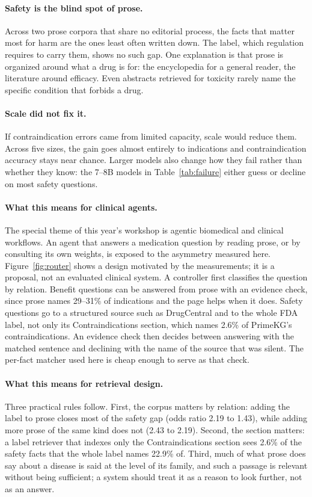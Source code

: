\documentclass[letterpaper]{article} %
\begin{document}
\paragraph{Safety is the blind spot of prose.}
Across two prose corpora that share no editorial process, the facts that
matter most for harm are the ones least often written down. The label, which
regulation requires to carry them, shows no such gap. One explanation is that
prose is organized around what a drug is for: the encyclopedia for a general
reader, the literature around efficacy. Even abstracts retrieved for toxicity
rarely name the specific condition that forbids a drug.

\paragraph{Scale did not fix it.}
If contraindication errors came from limited capacity, scale would reduce
them. Across five sizes, the gain goes almost entirely to indications and
contraindication accuracy stays near chance. Larger models also change how
they fail rather than whether they know: the 7--8B models in
Table~\ref{tab:failure} either guess or decline on most safety questions.

\paragraph{What this means for clinical agents.}
The special theme of this year's workshop is agentic biomedical and clinical
workflows. An agent that answers a medication question by reading prose, or by
consulting its own weights, is exposed to the asymmetry measured here.
Figure~\ref{fig:router} shows a design motivated by the measurements; it is a
proposal, not an evaluated clinical system. A
controller first classifies the question by relation. Benefit questions can
be answered from prose with an evidence check, since prose names 29--31\% of
indications and the page helps when it does. Safety questions go to a
structured source such as DrugCentral and to the whole FDA label, not only its
Contraindications section, which names 2.6\% of PrimeKG's contraindications.
An evidence check then decides between answering with the matched sentence and
declining with the name of the source that was silent. The per-fact matcher
used here is cheap enough to serve as that check.

\paragraph{What this means for retrieval design.}
Three practical rules follow. First, the corpus matters by relation: adding the
label to prose closes most of the safety gap (odds ratio 2.19 to 1.43), while
adding more prose of the same kind does not (2.43 to 2.19). Second, the
section matters: a label retriever that indexes only the Contraindications
section sees 2.6\% of the safety facts that the whole label names 22.9\% of.
Third, much of what prose does say about a disease is said at the level of its
family, and such a passage is relevant without being sufficient; a system
should treat it as a reason to look further, not as an answer.
\end{document}
